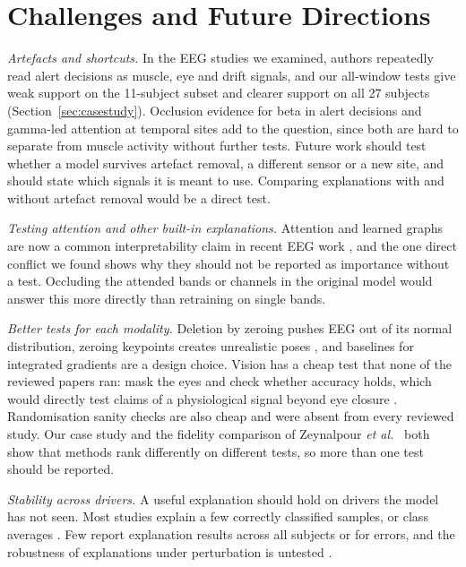 \section{Challenges and Future Directions}
\label{sec:challenges}

\textit{Artefacts and shortcuts.} In the EEG studies we examined, authors repeatedly read alert decisions as muscle, eye and drift signals, and our all-window tests give weak support on the 11-subject subset and clearer support on all 27 subjects (Section~\ref{sec:casestudy}). Occlusion evidence for beta in alert decisions \cite{zhuang2024connectivity} and gamma-led attention at temporal sites \cite{gao2024sftnet} add to the question, since both are hard to separate from muscle activity without further tests. Future work should test whether a model survives artefact removal, a different sensor or a new site, and should state which signals it is meant to use. Comparing explanations with and without artefact removal would be a direct test.

\textit{Testing attention and other built-in explanations.} Attention and learned graphs are now a common interpretability claim in recent EEG work \cite{an2024attention,zhuang2024connectivity,gao2024sftnet,xu2026dynamic}, and the one direct conflict we found \cite{gao2024sftnet} shows why they should not be reported as importance without a test. Occluding the attended bands or channels in the original model would answer this more directly than retraining on single bands.

\textit{Better tests for each modality.} Deletion by zeroing pushes EEG out of its normal distribution, zeroing keypoints creates unrealistic poses \cite{zeynalpour2025multimethod}, and baselines for integrated gradients are a design choice. Vision has a cheap test that none of the reviewed papers ran: mask the eyes and check whether accuracy holds, which would directly test claims of a physiological signal beyond eye closure \cite{nomura2025drowsiness}. Randomisation sanity checks \cite{adebayo2018sanity} are also cheap and were absent from every reviewed study. Our case study and the fidelity comparison of Zeynalpour \textit{et al.}~\cite{zeynalpour2025multimethod} both show that methods rank differently on different tests, so more than one test should be reported.

\textit{Stability across drivers.} A useful explanation should hold on drivers the model has not seen. Most studies explain a few correctly classified samples, or class averages \cite{gao2024sftnet,wu2024driver}. Few report explanation results across all subjects or for errors, and the robustness of explanations under perturbation is untested \cite{vitorino2023adversarial}.

